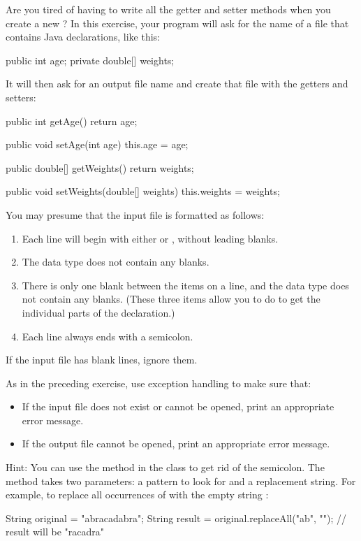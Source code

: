 \begin{exercise}
Are you tired of having to write all the getter and setter methods when you create a new ? In this exercise, your program will ask for the name of a file that contains Java declarations, like this:

\begin{stdout}
public int age;
private double[] weights;
\end{stdout}

It will then ask for an output file name and create that file with the getters and setters:

\begin{stdout}
public int getAge() {
    return age;
}

public void setAge(int age) {
    this.age = age;
}

public double[] getWeights() {
    return weights;
}

public void setWeights(double[] weights) {
    this.weights = weights;
}
\end{stdout}

You may presume that the input file is formatted as follows:

\begin{enumerate}
\item Each line will begin with either  or , without leading blanks.
\item The data type does not contain any blanks.
\item There is only one blank between the items on a line, and the data type does not contain any blanks. (These three items allow you to do  to get the individual parts of the declaration.)
\item Each line always ends with a semicolon.
\end{enumerate}

If the input file has blank lines, ignore them.

As in the preceding exercise, use exception handling to make sure that:

\begin{itemize}
\item If the input file does not exist or cannot be opened, print an appropriate error message.
\item If the output file cannot be opened, print an appropriate error message.
\end{itemize}

Hint: You can use the  method in the  class to get rid of the semicolon. The  method takes two parameters: a pattern to look for and a replacement string. For example, to replace all occurrences of  with the empty string :

\begin{code}
String original = "abracadabra";
String result = original.replaceAll("ab", "");
// result will be "racadra"
\end{code}

\end{exercise}

